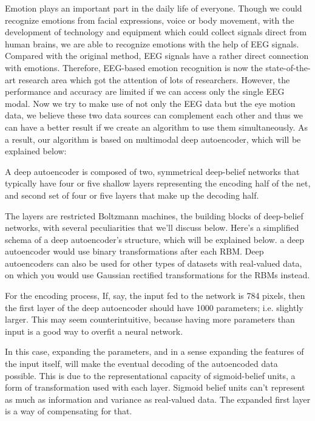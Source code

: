 \begin{bigabstract}

Emotion plays an important part in the daily life of everyone. Though we could recognize emotions from facial expressions, voice or body movement, with the development of technology and equipment which could collect signals direct from human brains, we are able to recognize emotions with the help of EEG signals. Compared with the original method, EEG signals have a rather direct connection with emotions. Therefore, EEG-based emotion recognition is now the state-of-the-art research area which got the attention of lots of researchers. However, the performance and accuracy are limited if we can access only the single EEG modal.  Now we try to make use of not only the EEG data but the eye motion data, we believe these two data sources can complement each other and thus we can have a better result if we create an algorithm to use them simultaneously. As a result, our algorithm is based on multimodal deep autoencoder, which will be explained below:

	A deep autoencoder is composed of two, symmetrical deep-belief networks that typically have four or five shallow layers representing the encoding half of the net, and second set of four or five layers that make up the decoding half.

	The layers are restricted Boltzmann machines, the building blocks of deep-belief networks, with several peculiarities that we’ll discuss below. Here’s a simplified schema of a deep autoencoder’s structure, which will be  explained below. a deep autoencoder would use binary transformations after each RBM. Deep autoencoders can also be used for other types of datasets with real-valued data, on which you would use Gaussian rectified transformations for the RBMs instead.

	For the encoding process, If, say, the input fed to the network is 784 pixels, then the first layer of the deep autoencoder should have 1000 parameters; i.e. slightly larger.
This may seem counterintuitive, because having more parameters than input is a good way to overfit a neural network.

	In this case, expanding the parameters, and in a sense expanding the features of the input itself, will make the eventual decoding of the autoencoded data possible.
This is due to the representational capacity of sigmoid-belief units, a form of transformation used with each layer. Sigmoid belief units can’t represent as much as information and variance as real-valued data. The expanded first layer is a way of compensating for that.


\end{bigabstract}
